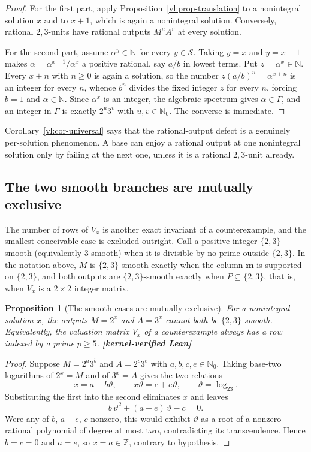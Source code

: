 \documentclass[11pt,oneside]{article}
\newtheorem{proposition}[theorem]{Proposition}
\theoremstyle{definition}
\theoremstyle{remark}
\newcommand{\N}{\mathbb N}
\newcommand{\Nzero}{\mathbb N_0}
\newcommand{\Z}{\mathbb Z}
\newcommand{\thetaq}{\vartheta}
\newcommand{\Sol}{\mathcal S}
\newcommand{\GammaSat}{\Gamma}
\newcommand{\statuslean}{\textcolor{leanblue}{\textbf{[kernel-verified Lean]}}}
\begin{document}
\begin{proof}
For the first part, apply Proposition~\ref{vl:prop-translation} to a nonintegral solution $x$
and to $x+1$, which is again a nonintegral solution.  Conversely, rational $2,3$-units have
rational outputs $M^uA^v$ at every solution.

For the second part, assume $\alpha^y\in\N$ for every $y\in\Sol$.  Taking $y=x$ and $y=x+1$
makes $\alpha=\alpha^{x+1}/\alpha^x$ a positive rational, say $a/b$ in lowest terms.  Put
$z=\alpha^x\in\N$.  Every $x+n$ with $n\ge0$ is again a solution, so the number
$z(a/b)^n=\alpha^{x+n}$ is an integer for every $n$, whence
$b^n$ divides the fixed integer $z$ for every $n$, forcing $b=1$ and $\alpha\in\N$.  Since
$\alpha^x$ is an integer, the algebraic spectrum gives $\alpha\in\GammaSat$, and an integer in
$\GammaSat$ is exactly $2^u3^v$ with $u,v\in\Nzero$.  The converse is immediate.
\end{proof}

Corollary~\ref{vl:cor-universal} says that the rational-output defect is a genuinely
per-solution phenomenon.  A base can enjoy a rational output at one nonintegral solution only
by failing at the next one, unless it is a rational $2,3$-unit already.

\subsection{The two smooth branches are mutually exclusive}

The number of rows of $V_x$ is another exact invariant of a counterexample, and the smallest
conceivable case is excluded outright.  Call a positive integer $\{2,3\}$-smooth (equivalently
$3$-smooth) when it is divisible by no prime outside $\{2,3\}$.  In the notation above, $M$ is
$\{2,3\}$-smooth exactly when the column $\mathbf m$ is supported on $\{2,3\}$, and both
outputs are $\{2,3\}$-smooth exactly when $P\subseteq\{2,3\}$, that is, when $V_x$ is a
$2\times2$ integer matrix.

\begin{proposition}[The smooth cases are mutually exclusive]
\label{vl:prop-not-both-smooth}
For a nonintegral solution $x$, the outputs $M=2^x$ and $A=3^x$ cannot both be
$\{2,3\}$-smooth.  Equivalently, the valuation matrix $V_x$ of a counterexample always has a
row indexed by a prime $p\ge5$.  \statuslean
\end{proposition}

\begin{proof}
Suppose $M=2^a3^b$ and $A=2^c3^e$ with $a,b,c,e\in\Nzero$.  Taking base-two logarithms of
$2^x=M$ and of $3^x=A$ gives the two relations
\[
  x=a+b\thetaq,\qquad x\thetaq=c+e\thetaq ,\qquad \thetaq=\log_23 .
\]
Substituting the first into the second eliminates $x$ and leaves
\[
  b\,\thetaq^{2}+(a-e)\,\thetaq-c=0 .
\]
Were any of $b$, $a-e$, $c$ nonzero, this would exhibit $\thetaq$ as a root of a nonzero
rational polynomial of degree at most two, contradicting its transcendence.  Hence $b=c=0$ and
$a=e$, so $x=a\in\Z$, contrary to hypothesis.
\end{proof}
\end{document}
